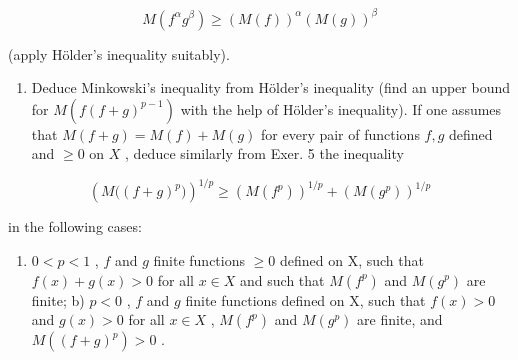\[
M (f ^ {\alpha} g ^ {\beta}) \geqslant (M (f)) ^ {\alpha} (M (g)) ^ {\beta}
\]

(apply Hölder's inequality suitably).

\begin{enumerate}
\def\labelenumi{\arabic{enumi})}
\setcounter{enumi}{5}
\tightlist
\item
  Deduce Minkowski's inequality from Hölder's inequality (find an upper bound for \(M(f(f + g)^{p-1})\) with the help of Hölder's inequality). If one assumes that \(M(f + g) = M(f) + M(g)\) for every pair of functions \(f, g\) defined and \(\geqslant 0\) on \(X\) , deduce similarly from Exer. 5 the inequality
\end{enumerate}

\[
\left(M \big ((f + g) ^ {p} \big)\right) ^ {1 / p} \geqslant \left(M (f ^ {p})\right) ^ {1 / p} + \left(M (g ^ {p})\right) ^ {1 / p}
\]

in the following cases:

\begin{enumerate}
\def\labelenumi{\alph{enumi})}
\tightlist
\item
  \(0 < p < 1\) , \(f\) and \(g\) finite functions \(\geqslant 0\) defined on X, such that \(f(x) + g(x) > 0\) for all \(x \in X\) and such that \(M(f^p)\) and \(M(g^p)\) are finite; b) \(p < 0\) , \(f\) and \(g\) finite functions defined on X, such that \(f(x) > 0\) and \(g(x) > 0\) for all \(x \in X\) , \(M(f^p)\) and \(M(g^p)\) are finite, and \(M((f + g)^p) > 0\) .
\end{enumerate}


